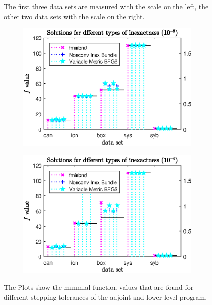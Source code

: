 \begin{figure}[ht]
{	The first three data sets are measured with the scale on the left, the other two data sets with the scale on the right.}%
	\label{fig_llad84C}%
\end{figure}

\begin{figure}[ht]
	\begin{subfigure}{0.49\textwidth}
		\includegraphics[width=\textwidth]{Pictures/Plots/Scal100_llad-8f.eps}%
	\end{subfigure}
	\begin{subfigure}{0.49\textwidth}
		\includegraphics[width=\textwidth]{Pictures/Plots/Scal100_llad-4f.eps}%
	\end{subfigure}
	\caption[Minimal value for different stopping tolerances of the lower level and adjoint program]{The Plots show the minimial function values that are found for different stopping tolerances of the adjoint and lower level program.\\
}
\end{figure}
